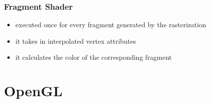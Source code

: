 \documentclass[twocolumn,landscape,10pt]{article}
\theoremstyle{definition}
\begin{document}
\subsubsection{Fragment Shader}

\begin{itemize}
    \item executed once for every fragment generated by the rasterization
    \item it takes in interpolated vertex attributes
    \item it calculates the color of the corresponding fragment
\end{itemize} 

\section{OpenGL}
\end{document}
